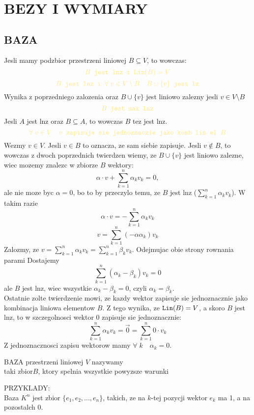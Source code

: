 \documentclass{article}
\begin{document}
\ttfamily
\section*{BEZY I WYMIARY}
\subsection*{BAZA}
    Jesli mamy podzbior przestrzeni liniowej $B\subseteq V$, to wowczas:
    $$\color{acc}B\texttt{ jest lnz i }\Lin{B}=V$$
    $$\color{acc}B\texttt{ jest lnz i }\forall\;v\in V\setminus B\quad B\cup\{v\}\texttt{ jest lz}$$
    Wynika z poprzedniego zalozenia oraz $B\cup\{v\}$ jest liniowo zalezny jesli $v\in V\setminus B$
    $$\color{acc}B\texttt{ jest max lnz}$$
    Jesli $A$ jest lnz oraz $B\subseteq A$, to wowczas $B$ tez jest lnz.
    $$\color{acc}\forall\;v\in V\quad v\texttt{ zapisuje sie jednoznaczie jako komb lin el } B$$
    Wezmy $v\in V$. Jesli $v\in B$ to oznacza, ze sam siebie zapisuje. Jesli $v\notin B$, to wowczas z dwoch poprzednich twierdzen wiemy, ze $B\cup\{v\}$ jest liniowo zalezne, wiec mozemy znalezc w zbiorze $B$ wektory:
    $$\alpha\cdot  v+\sum\limits_{k=1}^n\alpha_kv_k=0,$$
    ale nie moze byc $\alpha=0$, bo to by przeczylo temu, ze $B$ jest lnz ($\sum\limits_{k=1}^n\alpha_kv_k$). W takim razie
    $$\alpha\cdot v=-\sum\limits_{k=1}^n\alpha_kv_k$$
    $$v=\sum_{k=1}^n(-\alpha\alpha_k)v_k$$
    Zalozmy, ze $v=\sum\limits_{k=1}^n\alpha_kv_k=\sum\limits_{k=1}^n\beta_kv_k$. Odejmujac obie strony rownania parami Dostajemy
    $$\sum\limits_{k=1}^n(\alpha_k-\beta_k)v_k=0$$
    ale $B$ jest lnz, wiec wszystkie $\alpha_k-\beta_k=0$, czyli $\alpha_k=\beta_k$.\medskip\\
    Ostatnie zolte twierdzenie mowi, ze kazdy wektor zapisuje sie jednoznacznie jako kombinacja liniowa elementow $B$. Z tego wynika, ze $\texttt{Lin}(B)=V$, a skoro $B$ jest lnz, to w szczegolnosci wektor 0 zapisuje sie jednoznacznie:
    $$\sum\limits_{k=1}^n\alpha_kv_k=\overset{\to}{0}=\sum\limits_{k=1}^n0\cdot v_k$$
    Z jednoznacznosci zapisu wektorow mamy $\forall\;k\quad \alpha_k=0.$\bigskip\\
    \bigskip
    \begin{center}
        \color{def}BAZA \color{txt}przestrzeni liniowej $V$ nazywamy \\
        taki zbior$B$, ktory spelnia wszystkie powyzsze warunki
    \end{center}
    \color{emp}PRZYKLADY\color{txt}:\medskip\\
    Baza $K^n$ jest zbior $\{e_1, e_2, ..., e_n\}$, takich, ze na $k$-tej pozycji wektor $e_k$ ma 1, a na pozostalch 0.\medskip\\
\end{document}
